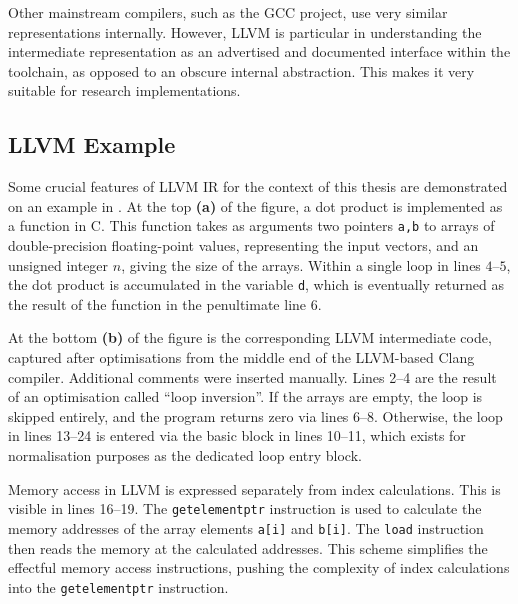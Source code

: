     Other mainstream compilers, such as the GCC project, use very similar
    representations internally.
    However, LLVM is particular in understanding the intermediate
    representation as an advertised and documented interface within the
    toolchain, as opposed to an obscure internal abstraction.
    This makes it very suitable for research implementations.

\subsection{LLVM Example}

    Some crucial features of LLVM IR for the context of this thesis are
    demonstrated on an example in .
    At the top {\bf (a)} of the figure, a dot product is implemented as a
    function in C.
    This function takes as arguments two pointers {\tt a,b} to arrays of
    double-precision floating-point values, representing the input vectors, and
    an unsigned integer $n$, giving the size of the arrays.
    Within a single loop in lines $4$--$5$, the dot product is accumulated in
    the variable {\tt d}, which is eventually returned as the result of the
    function in the penultimate line $6$.

    At the bottom {\bf (b)} of the figure is the corresponding LLVM intermediate
    code, captured after optimisations from the middle end of the LLVM-based
    Clang compiler.
    Additional comments were inserted manually.
    Lines 2--4 are the result of an optimisation called ``loop inversion''.
    If the arrays are empty, the loop is skipped entirely, and the program
    returns zero via lines 6--8.
    Otherwise, the loop in lines 13--24 is entered via the basic block in lines
    10--11, which exists for normalisation purposes as the dedicated loop entry
    block.

    Memory access in LLVM is expressed separately from index calculations.
    This is visible in lines 16--19.
    The {\tt getelementptr} instruction is used to calculate the memory
    addresses of the array elements {\tt a[i]} and {\tt b[i]}.
    The {\tt load} instruction then reads the memory at the calculated
    addresses.
    This scheme simplifies the effectful memory access instructions, pushing the
    complexity of index calculations into the {\tt getelementptr} instruction.

